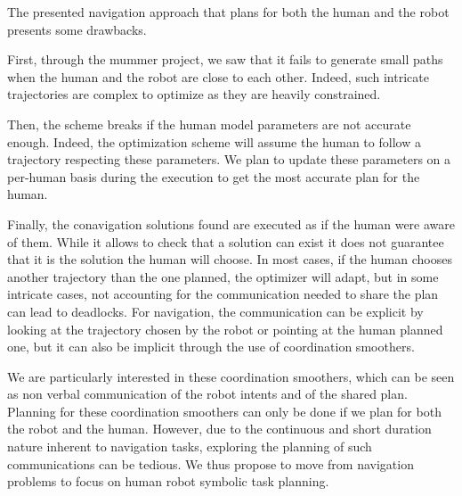 \documentclass[a4paper,11pt,twoside]{StyleThese}
\begin{document}
\medskip

The presented navigation approach that plans for both the human and the robot presents some drawbacks. 

First, through the \acrshort{mummer} project, we saw that it fails to generate small paths when the human and the robot are close to each other. Indeed, such intricate trajectories are complex to optimize as they are heavily constrained. 

Then, the scheme breaks if the human model parameters are not accurate enough. Indeed, the optimization scheme will assume the human to follow a trajectory respecting these parameters. We plan to update these parameters on a per-human basis during the execution to get the most accurate plan for the human. 

Finally, the conavigation solutions found are executed as if the human were aware of them. While it allows to check that a solution can exist it does not guarantee that it is the solution the human will choose. In most cases, if the human chooses another trajectory than the one planned, the optimizer will adapt, but in some intricate cases, not accounting for the communication needed to share the plan can lead to deadlocks. For navigation, the communication can be explicit by looking at the trajectory chosen by the robot or pointing at the human planned one, but it can also be implicit through the use of coordination smoothers.

We are particularly interested in these coordination smoothers, which can be seen as non verbal communication of the robot intents and of the shared plan. Planning for these coordination smoothers can only be done if we plan for both the robot and the human. However, due to the continuous and short duration nature inherent to navigation tasks, exploring the planning of such communications can be tedious. We thus propose to move from navigation problems to focus on human robot symbolic task planning.


\ifdefined{}
\else


\end{document}
